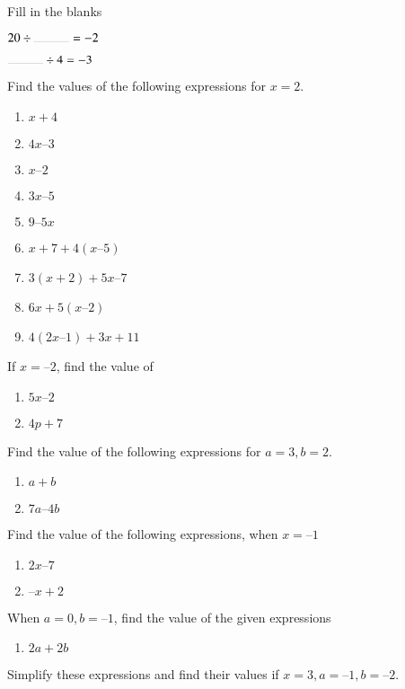 Fill in the blanks
\begin{enumerate}[label=\thesection.\arabic*, ref=\thesection.\theenumi,resume*]
	\begin{multicols}{2}
		\item	$20 \div \rule{1cm}{0.1pt}=-2$
		\item	$\rule{1cm}{0.1pt}\div 4=-3$
	\end{multicols}
\end{enumerate}
Find the values of the following expressions for $x = 2$. 
\begin{enumerate}[label=\thesection.\arabic*, ref=\thesection.\theenumi,resume*]
\item $x + 4$
\item  $4x – 3$ 
\item $ x – 2$
\item $ 3x – 5 $
\item $ 9 – 5x $
\item $ x + 7 + 4 (x – 5)$
\item $ 3 (x + 2) + 5x – 7 $
\item $ 6x + 5 (x – 2) $
\item $ 4(2x – 1) + 3x + 11$
\end{enumerate}
If $x = – 2$, find the value of
\begin{enumerate}[label=\thesection.\arabic*, ref=\thesection.\theenumi,resume*]
\item $5x – 2$
\item $4p + 7$
\end{enumerate}
Find the value of the following expressions for $a = 3, b = 2$. 
\begin{enumerate}[label=\thesection.\arabic*, ref=\thesection.\theenumi,resume*]
\item $a + b$				
\item $ 7a – 4b $
\end{enumerate}
Find the value of the following expressions, when $x = –1$ 
\begin{enumerate}[label=\thesection.\arabic*, ref=\thesection.\theenumi,resume*]
\item $ 2x – 7$
\item $ – x + 2$ 
\end{enumerate}
When $a = 0, b = – 1$, find the value of the given expressions
\begin{enumerate}[label=\thesection.\arabic*, ref=\thesection.\theenumi,resume*]
\item $2a + 2b$
\end{enumerate}
Simplify these expressions and find their values if $x = 3, a = – 1, b = – 2$. 
